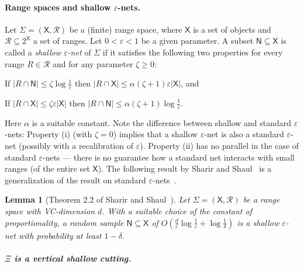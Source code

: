 \documentclass[11pt]{article}
\def\eps{{\varepsilon}}
\def\R{\mathcal{R}}
\def\XX{\mathsf{X}}
\def\NN{\mathsf{N}}
\newtheorem{lemma}[theorem]{Lemma}
\theoremstyle{definition}
\begin{document}
\paragraph{Range spaces and shallow $\eps$-nets.}
\fi

Let $\Sigma=(\XX,\R)$ be a (finite) range space, where $\XX$ is a set of objects and $\R \subseteq 2^\XX$ a set of ranges.
Let $0 < \eps < 1$ be a given parameter. A subset $\NN \subseteq \XX$ is called 
a \emph{shallow $\eps$-net} of $\Sigma$ if it satisfies the following two properties
for every range $R \in \R$ and for any parameter $\zeta \ge 0$:

\medskip
{}
If $|R\cap \NN| \le \zeta \log \frac{1}{\eps}$ then $|R\cap \XX| \le \alpha(\zeta + 1)\eps|\XX|$, and

\medskip
{}
If $|R\cap \XX| \le \zeta\eps|\XX|$ then $|R\cap \NN| \le \alpha(\zeta + 1) \log \frac{1}{\eps}$. 

\medskip
Here $\alpha$ is a suitable constant.
Note the difference between shallow and standard $\eps$-nets: Property (i) (with $\zeta = 0$) implies that
a shallow $\eps$-net is also a standard $\eps$-net (possibly with a recalibration of $\eps$). 
Property (ii) has no parallel in the case of standard $\eps$-nets --- there is no guarantee how 
a standard net interacts with small ranges (of the entire set $\XX$). The following result by 
Sharir and Shaul~\cite{ShSh} is a generalization of the result on standard $\eps$-nets~\cite{HW87}.

\begin{lemma}[Theorem 2.2 of Sharir and Shaul~]
	\label{lem:shallow-net}
Let $\Sigma=(\XX,\R)$ be a range space with VC-dimension $d$.
With a suitable choice of the constant of proportionality, a random sample $\NN \subseteq \XX$ of
${\displaystyle O\left(\frac{d}{\eps}\log\frac{1}{\eps} + \log\frac{1}{\delta}\right)}$
is a shallow $\eps$-net with probability at least $1 - \delta$.
\end{lemma}

\ifsocgproc 
\subparagraph*{$\Xi$ is a vertical shallow cutting.}
\else
\end{document}
